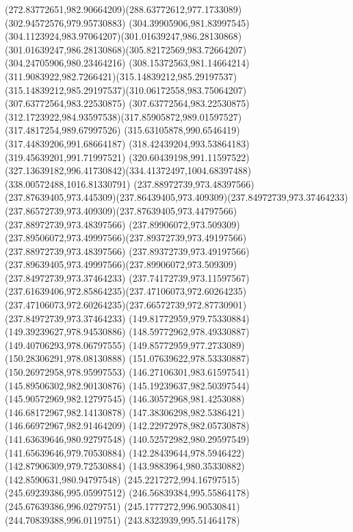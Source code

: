 {{	\curveto(272.83772651,982.90664209)(288.63772612,977.1733089)(302.94572576,979.95730883)
	\curveto(304.39905906,981.83997545)(304.1123924,983.97064207)(301.01639247,986.28130868)
	\curveto(301.01639247,986.28130868)(305.82172569,983.72664207)(304.24705906,980.23464216)
	\curveto(308.15372563,981.14664214)(311.9083922,982.7266421)(315.14839212,985.29197537)
	\curveto(315.14839212,985.29197537)(310.06172558,983.75064207)(307.63772564,983.22530875)
	\curveto(307.63772564,983.22530875)(312.1723922,984.93597538)(317.85905872,989.01597527)
	\lineto(317.4817254,989.67997526)
	\lineto(315.63105878,990.6546419)
	\lineto(317.44839206,991.68664187)
	\lineto(318.42439204,993.53864183)
	\lineto(319.45639201,991.71997521)
	\lineto(320.60439198,991.11597522)
	\curveto(327.13639182,996.41730842)(334.41372497,1004.68397488)(338.00572488,1016.81330791)
	\moveto(237.88972739,973.48397566)
	\curveto(237.87639405,973.445309)(237.86439405,973.409309)(237.84972739,973.37464233)
	\curveto(237.86572739,973.409309)(237.87639405,973.44797566)(237.88972739,973.48397566)
	\moveto(237.89906072,973.509309)
	\curveto(237.89506072,973.49997566)(237.89372739,973.49197566)(237.88972739,973.48397566)
	\curveto(237.89372739,973.49197566)(237.89639405,973.49997566)(237.89906072,973.509309)
	\moveto(237.84972739,973.37464233)
	\curveto(237.74172739,973.11597567)(237.61639406,972.85864235)(237.47106073,972.60264235)
	\curveto(237.47106073,972.60264235)(237.66572739,972.87730901)(237.84972739,973.37464233)
	\moveto(149.81772959,979.75330884)
	\lineto(149.39239627,978.94530886)
	\lineto(148.59772962,978.49330887)
	\lineto(149.40706293,978.06797555)
	\lineto(149.85772959,977.2733089)
	\lineto(150.28306291,978.08130888)
	\lineto(151.07639622,978.53330887)
	\lineto(150.26972958,978.95997553)
	\closepath
	\moveto(146.27106301,983.61597541)
	\lineto(145.89506302,982.90130876)
	\lineto(145.19239637,982.50397544)
	\lineto(145.90572969,982.12797545)
	\lineto(146.30572968,981.4253088)
	\lineto(146.68172967,982.14130878)
	\lineto(147.38306298,982.5386421)
	\lineto(146.66972967,982.91464209)
	\closepath
	\moveto(142.22972978,982.05730878)
	\lineto(141.63639646,980.92797548)
	\lineto(140.52572982,980.29597549)
	\lineto(141.65639646,979.70530884)
	\lineto(142.28439644,978.5946422)
	\lineto(142.87906309,979.72530884)
	\lineto(143.9883964,980.35330882)
	\lineto(142.8590631,980.94797548)
	\closepath
	\moveto(245.2217272,994.16797515)
	\lineto(245.69239386,995.05997512)
	\lineto(246.56839384,995.55864178)
	\lineto(245.67639386,996.0279751)
	\lineto(245.1777272,996.90530841)
	\lineto(244.70839388,996.0119751)
	\lineto(243.8323939,995.51464178)
}}
